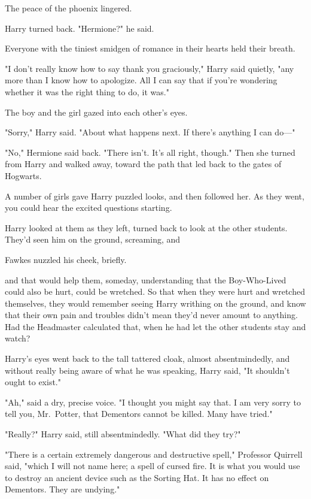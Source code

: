 The peace of the phoenix lingered.

Harry turned back. "Hermione?" he said.

Everyone with the tiniest smidgen of romance in their hearts held their breath.

"I don't really know how to say thank you graciously," Harry said quietly, "any
more than I know how to apologize. All I can say that if you're wondering
whether it was the right thing to do, it was."

The boy and the girl gazed into each other's eyes.

"Sorry," Harry said. "About what happens next. If there's anything I can do---"

"No," Hermione said back. "There isn't. It's all right, though." Then she
turned from Harry and walked away, toward the path that led back to the gates
of Hogwarts.

A number of girls gave Harry puzzled looks, and then followed her. As they
went, you could hear the excited questions starting.

Harry looked at them as they left, turned back to look at the other students.
They'd seen him on the ground, screaming, and{\el}

Fawkes nuzzled his cheek, briefly.

{\el} and that would help them, someday, understanding that the Boy-Who-Lived
could also be hurt, could be wretched. So that when they were hurt and wretched
themselves, they would remember seeing Harry writhing on the ground, and know
that their own pain and troubles didn't mean they'd never amount to anything.
Had the Headmaster calculated that, when he had let the other students stay and
watch?

Harry's eyes went back to the tall tattered cloak, almost absentmindedly, and
without really being aware of what he was speaking, Harry said, "It shouldn't
ought to exist."

"Ah," said a dry, precise voice. "I thought you might say that. I am very sorry
to tell you, Mr.~Potter, that Dementors cannot be killed. Many have tried."

"Really?" Harry said, still absentmindedly. "What did they try?"

"There is a certain extremely dangerous and destructive spell," Professor
Quirrell said, "which I will not name here; a spell of cursed fire. It is what
you would use to destroy an ancient device such as the Sorting Hat. It has no
effect on Dementors. They are undying."

